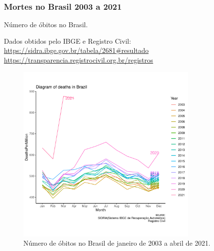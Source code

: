 \begin{frame}[allowframebreaks=1,fragile]
\frametitle{Mortes no Brasil 2003 a 2021}
\begin{minipage}[b]{0.47\textwidth}
\scriptsize
\begin{table}[h]
\caption{\label{tab-obitos-br}Número de óbitos no Brasil.}
\end{table}
\end{minipage}
\begin{minipage}[b]{0.47\textwidth}
\scriptsize
Dados obtidos pelo IBGE e Registro Civil:\\
\url{https://sidra.ibge.gov.br/tabela/2681#resultado} \\
\url{https://transparencia.registrocivil.org.br/registros}
\end{minipage}

\framebreak

\begin{figure}[h]
 \centering
 \includegraphics[width=0.8\textwidth,height=0.75\textheight,keepaspectratio]{examples/deaths-brazil-lines-per1E6.pdf}
 \caption{\small Número de óbitos no Brasil de janeiro de 2003 a abril de 2021.}
 \label{fig-deathsbr}
\end{figure}

\framebreak


\end{frame}
